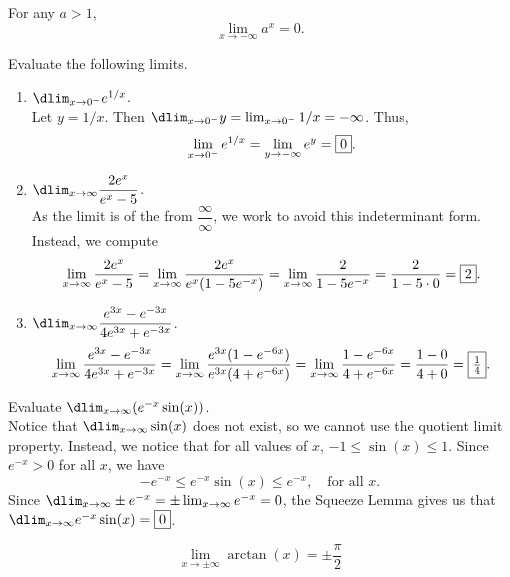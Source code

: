 \documentclass{book}
\begin{document}
\begin{Prop} For any $a>1$,  \[\lim_{x\to -\infty} a^x = 0.\]\end{Prop}\vs

\begin{Exam} Evaluate the following limits.
\begin{enumerate}
\item $\dlim_{x\to 0^-} e^{1/x}$.\\

Let $y = 1/x$. Then $\dlim_{x\to 0^-} y = \lim_{x\to 0^-} 1/x = -\infty$. Thus, \[\lim_{x\to 0^-} e^{1/x} = \lim_{y\to  -\infty} e^y = \fbox{$0$}. \]

 \item  $\dlim_{x\to \infty} \dfrac{2e^x}{e^x-5}$. \\

As the limit is of the from $\dfrac{\infty}{\infty}$, we work to avoid this indeterminant form. Instead, we compute
\[\lim_{x\to \infty} \dfrac{2e^x}{e^x-5} = \lim_{x\to \infty} \dfrac{2e^x}{e^x(1-5e^{-x})} = \lim_{x\to \infty} \dfrac{2}{1-5e^{-x}} = \dfrac{2}{1-5\cdot 0} = \fbox{$2$}.\]


\item $\dlim_{x\to \infty} \dfrac{e^{3x}-e^{-3x}}{4e^{3x}+e^{-3x}}$.\\

\[\lim_{x\to \infty} \dfrac{e^{3x}-e^{-3x}}{4e^{3x}+e^{-3x}} =  \lim_{x\to \infty} \dfrac{e^{3x}(1-e^{-6x})}{e^{3x}(4+e^{-6x})} = \lim_{x\to \infty} \dfrac{1-e^{-6x}}{4+e^{-6x}} = \dfrac{1-0}{4+0} = \fbox{$\frac{1}{4}$}. \]
\end{enumerate}
\end{Exam}\vs

\begin{Exam} Evaluate $\dlim_{x\to \infty} (e^{-x}\sin(x))$.\\

Notice that $\dlim_{x\to \infty} \sin(x) $ does not exist, so we cannot use the quotient limit property. Instead, we notice that for all values of $x$, $-1\le \sin(x) \le 1$. Since $e^{-x} > 0$ for all $x$, we have \[-e^{-x} \le e^{-x}\sin(x) \le e^{-x}, \quad\text{for all } x.\] Since $\dlim_{x\to \infty} \pm e^{-x} = \pm \lim_{x\to \infty} e^{-x} = 0$, the Squeeze Lemma gives us that $\dlim_{x\to \infty} e^{-x}\sin(x) = \fbox{$0$}$. \end{Exam}\vs

\begin{Prop}
 \[\lim_{x\to \pm\infty} \arctan(x) = \pm\dfrac{\pi}{2}\]
 \begin{center}
\end{center}
 \end{Prop}\vs
\end{document}
